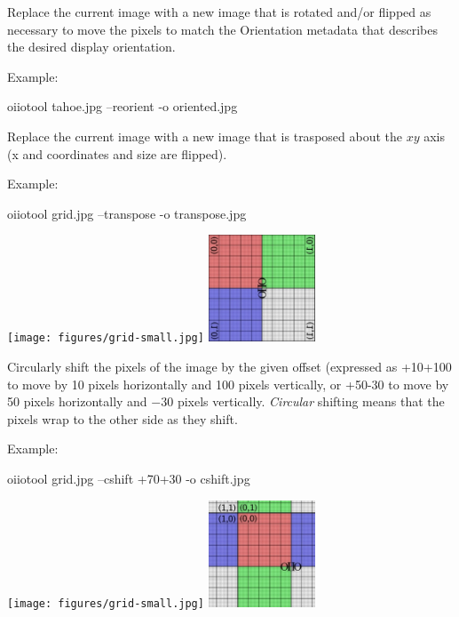 Replace the current image with a new image that is rotated and/or flipped
as necessary to move the pixels to match the Orientation metadata
that describes the desired display orientation.

\noindent Example:
\begin{code}
    oiiotool tahoe.jpg --reorient -o oriented.jpg
\end{code}
\apiend

Replace the current image with a new image that is trasposed about
the $xy$ axis (x and coordinates and size are flipped).

\noindent Example:
\begin{code}
    oiiotool grid.jpg --transpose -o transpose.jpg
\end{code}
\spc \texttt{[image: figures/grid-small.jpg]} 
\raisebox{40pt}{\large $\rightarrow$}
\includegraphics[width=1.25in]{figures/transpose.jpg} \\
\apiend

Circularly shift the pixels of the image by the given offset (expressed
as {\cf +10+100} to move by 10 pixels horizontally and 100 pixels
vertically, or {\cf +50-30} to move by 50 pixels horizontally and
$-30$ pixels vertically.  \emph{Circular} shifting means that the
pixels wrap to the other side as they shift.

\noindent Example:
\begin{code}
    oiiotool grid.jpg --cshift +70+30 -o cshift.jpg
\end{code}
\spc \texttt{[image: figures/grid-small.jpg]} 
\raisebox{40pt}{\large $\rightarrow$}
\includegraphics[width=1.25in]{figures/cshift.jpg} \\
\apiend

